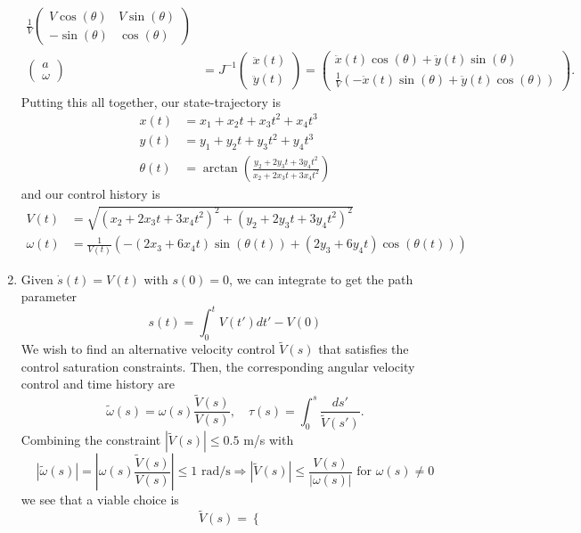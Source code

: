 \documentclass[12pt]{article}
\begin{document}
\begin{enumerate}
\begin{align*}
		\frac{1}{V}\left(\begin{array}{cc}
		V\cos(\theta) & V\sin(\theta) \\
		-\sin(\theta) & \cos(\theta)
		\end{array}\right) \\
		\left(\begin{array}{c}
		a \\
		\omega
		\end{array}\right) &=
		J^{-1}\left(\begin{array}{c}
		\ddot x(t) \\
		\ddot y(t)
		\end{array}\right) =
		\left(\begin{array}{c}
		\ddot x(t)\cos(\theta) + \ddot y(t)\sin(\theta) \\
		\frac{1}{V}(-\ddot x(t)\sin(\theta) + \ddot y(t)\cos(\theta))
		\end{array}\right).
	\end{align*}
	Putting this all together, our state-trajectory is
	\begin{align*}
		x(t) &= x_1 + x_2t + x_3t^2 + x_4t^3 \\
		y(t) &= y_1 + y_2t + y_3t^2 + y_4t^3 \\
		\theta(t) &= \arctan\left(\frac{y_2 + 2y_3t + 3y_4t^2}{x_2 + 2x_3t + 3x_4t^2}\right)
	\end{align*}
	and our control history is
	\begin{align*}
		V(t) &= \sqrt{(x_2 + 2x_3t + 3x_4t^2)^2 + (y_2 + 2y_3t + 3y_4t^2)^2} \\
		\omega(t) &= \frac{1}{V(t)}\left(-(2x_3 + 6x_4t)\sin(\theta(t)) + (2y_3 + 6y_4t)\cos(\theta(t))\right)
	\end{align*}
	\item Given $\dot s(t) = V(t)$ with $s(0) = 0$, we can integrate to get the path parameter
	\[
		s(t) = \int_0^t V(t')dt' - V(0)
	\]
	We wish to find an alternative velocity control $\tilde V(s)$ that satisfies the control saturation constraints. Then, the corresponding angular velocity control and time history are
	\[
		\tilde \omega(s) = \omega(s) \frac{\tilde V(s)}{V(s)}, \quad
		\tau(s) = \int_0^s \frac{ds'}{\tilde V(s')}.
	\]
	Combining the constraint $|\tilde V(s)| \leq 0.5$ m/s with
	\[
		|\tilde \omega(s)| = \left|\omega(s) \frac{\tilde V(s)}{V(s)}\right| \leq 1 \mbox{ rad/s} \Rightarrow |\tilde V(s)| \leq \frac{V(s)}{|\omega(s)|} \mbox{ for } \omega(s) \neq 0
	\]
	we see that a viable choice is
	\[
		\tilde V(s) = \begin{cases}

\end{cases}\]
\end{enumerate}
\end{document}
